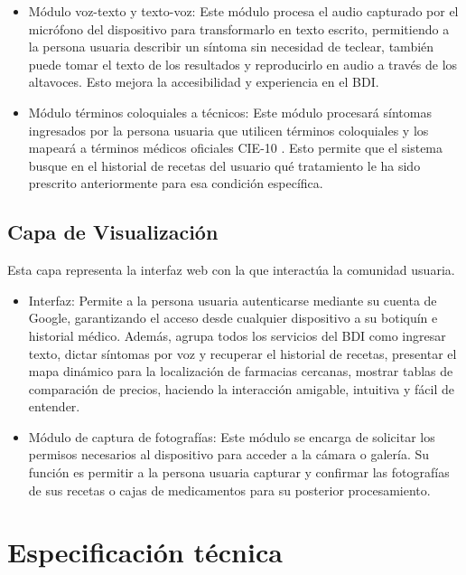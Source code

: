 \begin{itemize}
        \item Módulo voz-texto y texto-voz: Este módulo procesa el audio capturado por el micrófono del dispositivo para transformarlo en texto escrito, permitiendo a la persona usuaria describir un síntoma sin necesidad de teclear, también puede tomar el texto de los resultados y reproducirlo en audio a través de los altavoces. Esto mejora la accesibilidad y experiencia en el BDI. 

        \item Módulo términos coloquiales a técnicos: Este módulo procesará síntomas ingresados por la persona usuaria que utilicen términos coloquiales y los mapeará a términos médicos oficiales CIE-10 \cite{CIE10}. Esto permite que el sistema busque en el historial de recetas del usuario qué tratamiento le ha sido prescrito anteriormente para esa condición específica.
        
    \end{itemize}
    
\subsection{Capa de Visualización}
Esta capa representa la interfaz web con la que interactúa la comunidad usuaria.
\begin{itemize}
    \item Interfaz:  Permite a la persona usuaria autenticarse mediante su cuenta de Google, garantizando el acceso desde cualquier dispositivo a su botiquín e historial médico. Además, agrupa todos los servicios del BDI como ingresar texto, dictar síntomas por voz y recuperar el historial de recetas, presentar el mapa dinámico para la localización de farmacias cercanas, mostrar tablas de comparación de precios, haciendo la interacción amigable, intuitiva y fácil de entender.
    \item Módulo de captura de fotografías: Este módulo se encarga de solicitar los permisos   necesarios al dispositivo para acceder a la cámara o galería. Su función es permitir a la persona usuaria capturar y confirmar las fotografías de sus recetas o cajas de medicamentos para su posterior procesamiento.
    
\end{itemize}


\section{Especificación técnica}%


